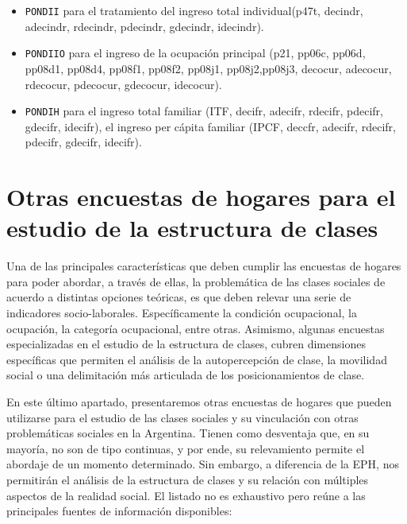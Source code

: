 \documentclass[
]{book}
\begin{document}
\begin{itemize}
\item
  \texttt{PONDII} para el tratamiento del ingreso total individual(p47t, decindr, adecindr, rdecindr, pdecindr,
  gdecindr, idecindr).
\item
  \texttt{PONDIIO} para el ingreso de la ocupación principal (p21, pp06c, pp06d, pp08d1, pp08d4, pp08f1, pp08f2, pp08j1, pp08j2,pp08j3, decocur, adecocur, rdecocur, pdecocur, gdecocur, idecocur).
\item
  \texttt{PONDIH} para el ingreso total familiar (ITF, decifr, adecifr, rdecifr, pdecifr, gdecifr, idecifr), el ingreso per cápita familiar (IPCF, deccfr, adecifr, rdecifr, pdecifr, gdecifr, idecifr).
\end{itemize}

\hypertarget{otras}{%
\section{Otras encuestas de hogares para el estudio de la estructura de clases}\label{otras}}

Una de las principales características que deben cumplir las encuestas de hogares para poder abordar, a través de ellas, la problemática de las clases sociales de acuerdo a distintas opciones teóricas, es que deben relevar una serie de indicadores socio-laborales. Específicamente la condición ocupacional, la ocupación, la categoría ocupacional, entre otras. Asimismo, algunas encuestas especializadas en el estudio de la estructura de clases, cubren dimensiones específicas que permiten el análisis de la autopercepción de clase, la movilidad social o una delimitación más articulada de los posicionamientos de clase.

En este último apartado, presentaremos otras encuestas de hogares que pueden utilizarse para el estudio de las clases sociales y su vinculación con otras problemáticas sociales en la Argentina. Tienen como desventaja que, en su mayoría, no son de tipo continuas, y por ende, su relevamiento permite el abordaje de un momento determinado. Sin embargo, a diferencia de la EPH, nos permitirán el análisis de la estructura de clases y su relación con múltiples aspectos de la realidad social. El listado no es exhaustivo pero reúne a las principales fuentes de información disponibles:
\end{document}
